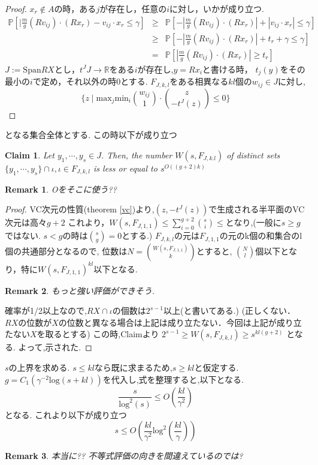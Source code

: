 \documentclass{jarticle}
\newtheorem*{rem}{Remark}
\newtheorem{clm}{Claim}
\begin{document}
\begin{proof}
$x_r \notin A$の時，ある$j$が存在し，任意の$i$に対し，いかが成り立つ.
\begin{eqnarray*}
  \mathbb{P} [ | \frac{m}{g}(Rv_{ij})\cdot (Rx_r) - v_{ij} \cdot  x_r \le  \gamma ]
  & \ge  & \mathbb{P} [ - | \frac{m}{g}(Rv_{ij})\cdot (Rx_r)| + |v_{ij} \cdot  x_r| \le  \gamma ] \\
  & \ge & \mathbb{P} [ - | \frac{m}{g}(Rv_{ij})\cdot (Rx_r)| +  t_r +  \gamma  \le  \gamma ] \\
  & =&  \mathbb{P} [ | \frac{m}{g}(Rv_{ij})\cdot (Rx_r)| \ge  t_r  ]
\end{eqnarray*}
$J:=\mathrm{Span}RX$とし，$t^J J \to \mathbb{R}$をある$i$が存在し,$y=Rx_i$と書ける時，
$t_j(y)$をその最小の$i$で定め，それ以外の時$0$とする.
$F_{J,k,l}$をある相異なる$kl$個の$w_{ij} \in J$に対し,
\begin{equation*}
 \{ z \mid \mathrm{max}_j \mathrm{min}_i \binom{w_{ij}}{1}\cdot \binom{z}{-t^J(z)} \le 0 \}
\end{equation*}
\end{proof}
となる集合全体とする.
この時以下が成り立つ
\begin{clm}
  Let $y_1, \cdots ,y_s \in J$. Then, the number $W(s,F_{J,k.l})$ of distinct sets
  $\{ y_1, \cdots , y_s\} \cap \iota , \iota \in F_{J,k,l}$ is less or equal to $s^{O((g+2)k)}$
\end{clm}
\begin{rem}
 Oをそこに使う??
\end{rem}
\begin{proof}
 VC次元の性質(theorem \ref{vc})より,$(z,-t^J(z))$で生成される半平面のVC次元は高々$g+2$
 これより，$W(s,F_{J,1,1})  \le \sum_{i=0}^{g+2}\binom{s}{i} \le $となり,(一般に$s \ge g$ではない.
 $s < g$の時は$\binom{s}{g}=0$とする.)
 $F_{J,k,l}$の元は$F_{J,1,1}$の元のk個の和集合のl個の共通部分となるので,
 位数は$N =\binom{W(s,F_{J,1,1})}{k}$とすると,
 $\binom{N}{l}$個以下となり，特に$W(s,F_{J,1,1})^{kl}$以下となる.

\begin{rem}
 もっと強い評価ができそう.
\end{rem}

確率が1/2以上なので,$RX \cap \iota$の個数は$2^{s-1}$以上(と書いてある.)
(正しくない．$RX$の位数が$X$の位数と異なる場合は上記は成り立たない．今回は上記が成り立たない$X$を取るとする)
この時,Claimより
$2^{s-1} \ge W(s,F_{J,k,l}) \ge  s^{kl(g+2)}$
となる.
よって,示された.
\end{proof}

$s$の上界を求める.
$s \le kl$なら既に求まるため,$s \ge kl$と仮定する.
$g = C_1(\gamma^{-2}\mathrm{log}(s+kl) )$を代入し,式を整理すると,以下となる.
\begin{equation*}
 \frac{s}{\mathrm{log}^2(s) } \le O (\frac{kl}{\gamma^2 })
\end{equation*}
となる.
これより以下が成り立つ
\begin{equation*}
s \le O(\frac{kl}{\gamma^2}\mathrm{log}^2(\frac{kl}{\gamma}))
\end{equation*}
\begin{rem}
 本当に?? 不等式評価の向きを間違えているのでは?
\end{rem}
\end{document}
